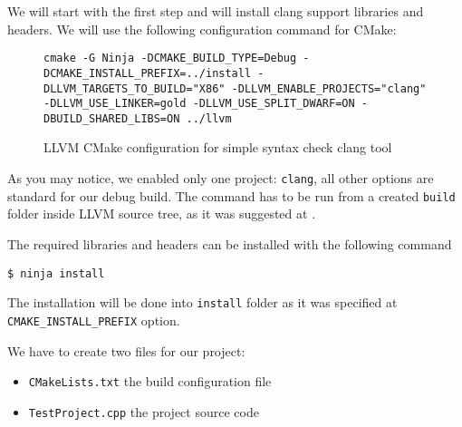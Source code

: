 We will start with the first step and will install clang support libraries and
headers. We will use the following configuration command for CMake:
\begin{figure}[H]
\begin{verbatim}
cmake -G Ninja -DCMAKE_BUILD_TYPE=Debug -DCMAKE_INSTALL_PREFIX=../install -DLLVM_TARGETS_TO_BUILD="X86" -DLLVM_ENABLE_PROJECTS="clang" -DLLVM_USE_LINKER=gold -DLLVM_USE_SPLIT_DWARF=ON -DBUILD_SHARED_LIBS=ON ../llvm
\end{verbatim}
\caption{LLVM CMake configuration for simple syntax check clang tool}
\label{lis:clang_tool_prepare}
\end{figure}
As you may notice, we enabled only one project: \texttt{clang}, all other
options are standard for our debug build. The command has to be run from a
created \texttt{build} folder inside LLVM source tree, as it was  suggested at
. 

The required libraries and headers can be installed with the following command
\begin{adjustwidth}{0em}{0em}
\begin{verbatim}
$ ninja install
\end{verbatim}
\end{adjustwidth}
The installation will be done into \texttt{install} folder as it was 
specified at \texttt{CMAKE_INSTALL_PREFIX} option.

We have to create two files for our project:
\begin{itemize}
\item \texttt{CMakeLists.txt} the build configuration file
\item \texttt{TestProject.cpp} the project source code
\end{itemize}

